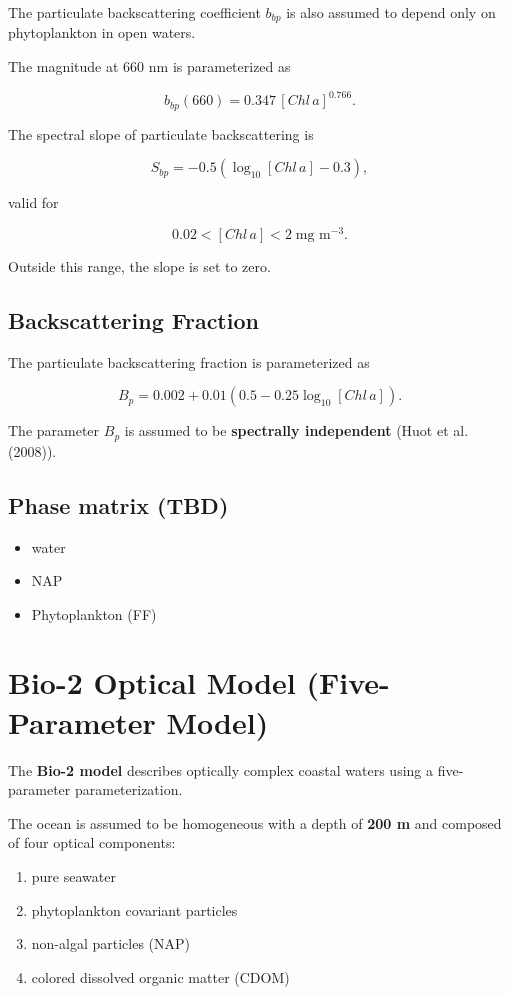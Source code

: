 \documentclass[
  11pt,
  letterpaper,
  DIV=11,
  numbers=noendperiod]{scrreprt}
\providecommand{\tightlist}{%
  \setlength{\itemsep}{0pt}\setlength{\parskip}{0pt}}
\begin{document}
The particulate backscattering coefficient \(b_{bp}\) is also assumed to
depend only on phytoplankton in open waters.

The magnitude at 660 nm is parameterized as

\[
b_{bp}(660) = 0.347\,[Chl\,a]^{0.766}.
\]

The spectral slope of particulate backscattering is

\[
S_{bp} = -0.5\left(\log_{10}[Chl\,a] - 0.3\right),
\]

valid for

\[
0.02 < [Chl\,a] < 2 \; \text{mg m}^{-3}.
\]

Outside this range, the slope is set to zero.

\subsection{Backscattering Fraction}\label{backscattering-fraction}

The particulate backscattering fraction is parameterized as

\[
B_p = 0.002 + 0.01\left(0.5 - 0.25\log_{10}[Chl\,a]\right).
\]

The parameter \(B_p\) is assumed to be \textbf{spectrally independent}
(Huot et al. (2008)).

\subsection{Phase matrix (TBD)}\label{phase-matrix-tbd}

\begin{itemize}
\tightlist
\item
  water
\item
  NAP
\item
  Phytoplankton (FF)
\end{itemize}

\section{Bio-2 Optical Model (Five-Parameter
Model)}\label{bio-2-optical-model-five-parameter-model}

The \textbf{Bio-2 model} describes optically complex coastal waters
using a five-parameter parameterization.

The ocean is assumed to be homogeneous with a depth of \textbf{200 m}
and composed of four optical components:

\begin{enumerate}
\def\labelenumi{\arabic{enumi}.}
\tightlist
\item
  pure seawater
\item
  phytoplankton covariant particles
\item
  non-algal particles (NAP)
\item
  colored dissolved organic matter (CDOM)
\end{enumerate}
\end{document}
